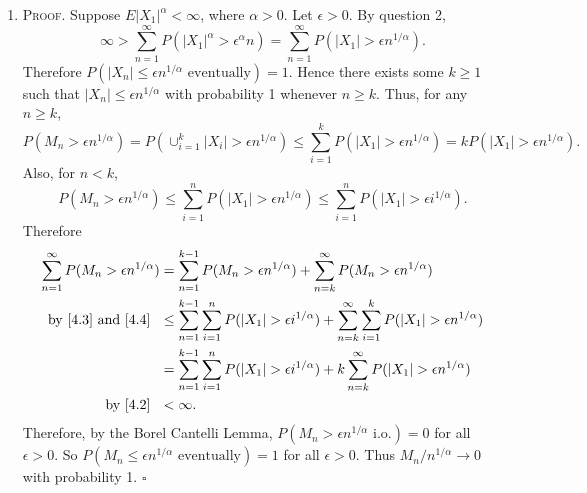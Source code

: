 \documentclass[12pt]{article}
\newcounter{ProofCounter}
\newenvironment{Proof}{\stepcounter{ProofCounter}\textsc{Proof.}}{\hfill$\square$}
\begin{document}
\begin{enumerate}[label=(\alph*)]
\item \begin{Proof}
Suppose $E|X_{1}|^{\alpha} < \infty$, where $\alpha > 0$. Let $\epsilon > 0$. By question 2,
\begin{equation}
\infty > \sum_{n=1}^{\infty}P(|X_{1}|^{\alpha} > \epsilon^{\alpha}n) = \sum_{n=1}^{\infty}P(|X_{1}| > \epsilon n^{1/\alpha}). 
\label{4.2}
\end{equation}
Therefore $P(|X_{n}| \leq \epsilon n^{1/\alpha} \text{ eventually}) = 1$. Hence there exists some $k \geq 1$ such that $|X_{n}| \leq \epsilon
n^{1/\alpha}$ with probability 1 whenever $n \geq k$. Thus, for any $n \geq k$,
\begin{equation}
P(M_{n} > \epsilon n^{1/\alpha}) = P\left( \cup_{i=1}^{k}|X_{i}| > \epsilon n^{1/\alpha} \right) \leq \sum_{i=1}^{k}P(|X_{1}| > \epsilon
n^{1/\alpha}) = kP(|X_{1}| > \epsilon n^{1/\alpha}). 
\label{4.3}
\end{equation}
Also, for $n < k$, 
\begin{equation}
P(M_{n} > \epsilon n^{1/\alpha}) \leq \sum_{i=1}^{n}P(|X_{1}| > \epsilon n^{1/\alpha}) \leq \sum_{i=1}^{n}P(|X_{1}| > \epsilon i^{1/\alpha}).
\label{4.4}
\end{equation}
Therefore 
\begin{align*}
\sum_{n=1}^{\infty}P(M_{n} > \epsilon n^{1/\alpha}) & = \sum_{n=1}^{k-1}P(M_{n} > \epsilon n^{1/\alpha}) + \sum_{n=k}^{\infty}P(M_{n} > \epsilon
n^{1/\alpha})  \\
\text{by \eqref{4.3} and \eqref{4.4} }\ & \leq \sum_{n=1}^{k-1}\sum_{i=1}^{n}P(|X_{1}| > \epsilon i^{1/\alpha}) + \sum_{n=k}^{\infty}\sum_{i=1}^{k}P(|X_{1}| > \epsilon n^{1/\alpha}) \\
& = \sum_{n=1}^{k-1}\sum_{i=1}^{n}P(|X_{1}| > \epsilon i^{1/\alpha}) + k\sum_{n=k}^{\infty}P(|X_{1}| > \epsilon n^{1/\alpha}) \\
\text{by \eqref{4.2} }\ & < \infty.
\end{align*}
Therefore, by the Borel Cantelli Lemma, $P(M_{n} > \epsilon n^{1/\alpha}\text{ i.o.}) = 0$ for all $\epsilon > 0$. So $P(M_{n} \leq \epsilon
n^{1/\alpha}\text{ eventually}) = 1$ for all $\epsilon > 0$. Thus $M_{n}/n^{1/\alpha} \rightarrow 0$ with probability 1.
\end{Proof}


\end{enumerate}
\end{document}
